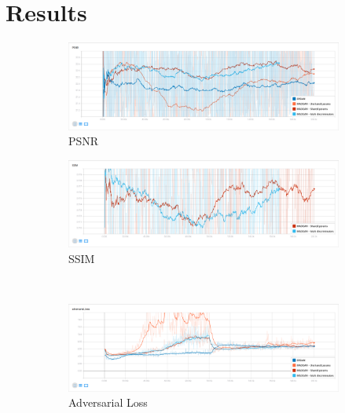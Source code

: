\documentclass[12pt,a4paper,twocolumn]{article}
\begin{document}
    \section{Results}
        \begin{figure}
            \centering
            \begin{subfigure}{0.48\textwidth}
                \includegraphics[width=\textwidth]{images/psnr.png}
                \caption{PSNR}\label{psnr-plot}
            \end{subfigure}
            \quad
            \begin{subfigure}{0.48\textwidth}
                \includegraphics[width=\textwidth]{images/ssim.png}
                \caption{SSIM}\label{ssim-plot}
            \end{subfigure}\\[5mm]
            \begin{subfigure}{0.48\textwidth}
                \includegraphics[width=\textwidth]{images/adv-loss.png}
                \caption{Adversarial Loss}\label{adv-loss}
            \end{subfigure}
            \quad
            \begin{subfigure}{0.48\textwidth}

\end{subfigure}
\end{figure}
\end{document}
